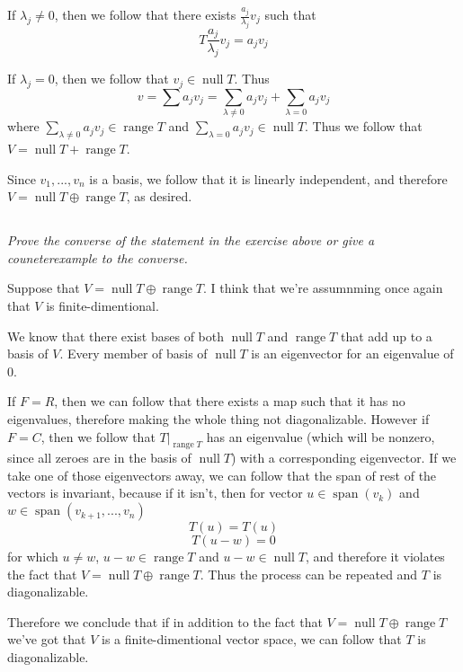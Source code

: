 \documentclass[11pt,oneside,titlepage]{book}
\DeclareMathOperator \ns {null}
\DeclareMathOperator \range {range}
\DeclareMathOperator \Span {span}
\begin{document}
If $\lambda_j \neq 0$, then we follow that there exists $\frac{a_j}{\lambda_j} v_j$ such that
$$T \frac{a_j}{\lambda_j} v_j  = a_j v_j$$

If $\lambda_j = 0$, then we follow that $v_j \in \ns T$. Thus
$$v = \sum {a_j v_j} = \sum_{\lambda \neq 0} {a_j v_j} + \sum_{\lambda = 0} {a_j v_j}$$
where $\sum_{\lambda \neq 0} {a_j v_j} \in \range T$ and $\sum_{\lambda = 0} {a_j v_j} \in \ns T$.
Thus we follow that $V = \ns T + \range T$.

Since $v_1, ..., v_n$ is a basis, we follow that it is linearly independent, and therefore
$V = \ns T \oplus \range T$, as desired.


\subsection{}

\textit{Prove the converse of the statement in the exercise above or give a couneterexample
  to the converse.}

Suppose that $V = \ns T \oplus \range T$. I think that we're assumnming once again that
$V$ is finite-dimentional.

We know that there exist bases of both $\ns T$ and $\range T$ that add up to a basis of $V$.
Every member of basis of $\ns T$ is an eigenvector for an eigenvalue of $0$.

If $F = R$, then we can follow that there exists a map such that it has no eigenvalues,
therefore making the whole thing not diagonalizable. However if $F = C$, then we follow that
$T|_{\range T}$ has an eigenvalue (which will be nonzero, since all zeroes are in the basis
of $\ns T$) with a corresponding eigenvector. If we take one of those eigenvectors away,
we can follow that the span of rest of the vectors is invariant, because if it isn't, then
for vector $u \in \Span(v_k)$ and $w \in \Span(v_{k + 1}, ..., v_n)$
$$T(u) = T(u)$$
$$T(u - w) = 0$$
for which $u \neq w$, $u - w \in \range T$ and $u - w \in \ns T$, and therefore it violates
the fact that $V = \ns T \oplus \range T$. Thus the process can be repeated and $T$ is
diagonalizable.

Therefore we conclude that if in addition to the fact that $V = \ns T \oplus \range T$ we've
got that $V$ is a finite-dimentional vector space, we can follow that $T$ is
diagonalizable.

\subsection{}
\end{document}
